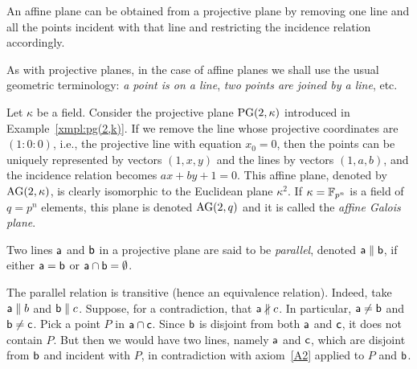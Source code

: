 \begin{rem}\label{rem:projective-line=affine}
    An affine plane can be obtained from a projective plane by removing one line and all the points incident with that line and restricting the incidence relation accordingly.

    As with projective planes, in the case of affine planes we shall use the usual geometric terminology: \textit{a point is on a line}, \textit{two points are joined by a line}, etc.
\end{rem}

\begin{xmpl}\label{xmpl:ag(2,k)}
    Let $\kappa$ be a field. Consider the projective plane $\operatorname{PG}(2,\kappa)$ introduced in Example~\ref{xmpl:pg(2,k)}. If we remove the line whose projective coordinates are $(1:0:0)$, i.e., the projective line with equation $x_0=0$, then the points can be uniquely represented by vectors $(1,x,y)$ and the lines by vectors $(1,a,b)$, and the incidence relation becomes $ax+by+1=0$. This affine plane, denoted by $\operatorname{AG}(2,\kappa)$, is clearly isomorphic to the Euclidean plane $\kappa^2$. If $\kappa=\mathbb{F}_{p^{n}}$ is a field of $q=p^n$ elements, this plane is denoted $\operatorname{AG}(2,q)$ and it is called the \textsl{affine Galois plane}.
\end{xmpl}

\begin{defn}
    Two lines $\mathsf a$ and $\mathsf b$ in a projective plane are said to be \textsl{parallel}, denoted $\mathsf a\parallel\mathsf b$, if either $\mathsf a=\mathsf b$ or $\mathsf a\cap\mathsf b = \emptyset$.
\end{defn}

\begin{rem}
     The parallel relation is transitive (hence an equivalence relation). Indeed, take $\mathsf a \parallel b$ and $\mathsf b \parallel c$. Suppose, for a contradiction, that $\mathsf a\nparallel c$. In particular, $\mathsf a\ne\mathsf b$ and $\mathsf b\ne\mathsf c$. Pick a point $P$ in $\mathsf a \cap\mathsf c$. Since $\mathsf b$ is disjoint from both $\mathsf a$ and $\mathsf c$, it does not contain $P$. But then we would have two lines, namely $\mathsf a$ and $\mathsf c$, which are disjoint from $\mathsf b$ and incident with $P$, in contradiction with axiom~\ref{A2} applied to $P$ and $\mathsf b$.
\end{rem}

